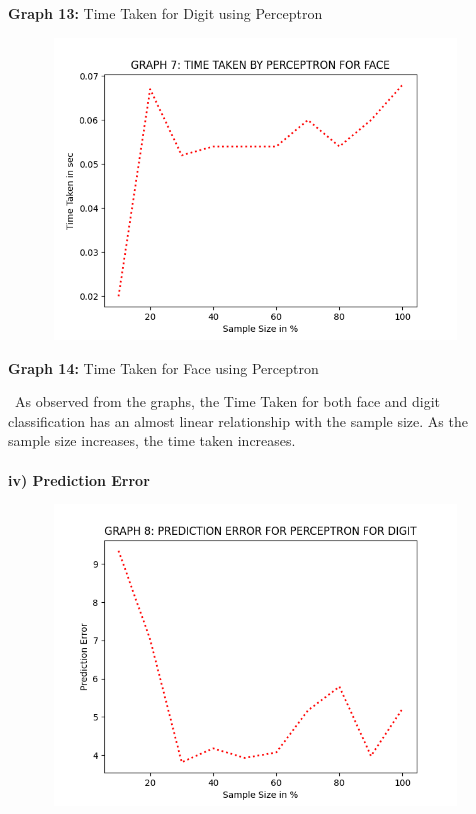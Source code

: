 \documentclass[10 pt]{report}   	%
\begin{document}
{\begin{center}
\small \textbf {Graph 13:} Time Taken for Digit using Perceptron\\
\end{center}
\begin{figure} [H]
\includegraphics [width = 11cm, height = 8cm]{PERC_TIME_FACE.png}
\end {figure}
\begin{center}
\small \textbf {Graph 14:} Time Taken for Face using Perceptron\\
\end{center}
\textbullet\ As observed from the graphs, the Time Taken for both face and digit classification has an almost linear relationship with the sample size. As the sample size increases, the time taken increases.\\ \\
\textbf{iv) Prediction Error}
\begin{figure} [H]
\includegraphics [width = 11cm, height = 8cm]{PERC_PRED_DIGIT.png}
\end {figure}
\begin{center}

\end{center}}
\end{document}
